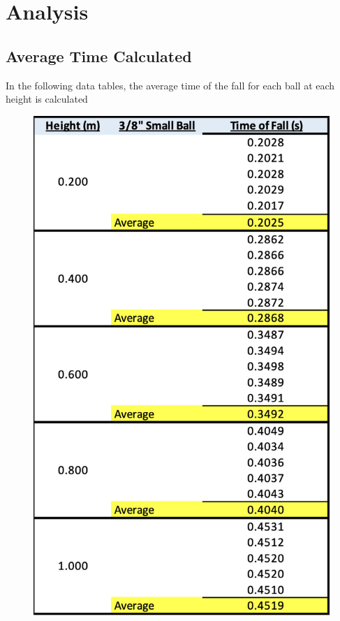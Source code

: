 \chapter{Analysis}

\section{Average Time Calculated}
In the following data tables, the average time of the fall for each ball at 
each height is calculated

\begin{figure}[!h]
  \begin{minipage}{0.45\textwidth}
    \centering
    \includegraphics[scale=0.39]{resources/SmallTableAverage.jpg}

\end{minipage}
\end{figure}
